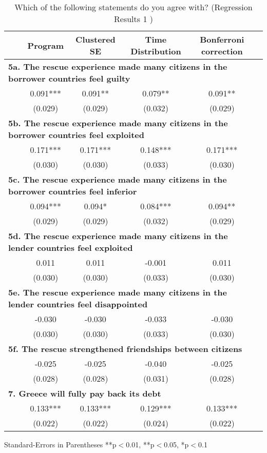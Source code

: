 \documentclass[12pt]{article}
\begin{document}
\begin{table}[h!]
\caption{Which of the following statements do you agree with? (Regression Results 1 )} 
\hskip -2.5cm 
\begin{tabular}{l*{5}{c}}
\hline\hline
\ \  &Program & Clustered SE & Time Distribution & Bonferroni correction \\
\hline
\multicolumn{5}{l}{\textbf{ 5a. The rescue experience made many citizens in the borrower countries feel guilty}} \\
\ \   &0.091{***}&0.091{**}&0.079{**} &0.091{**}\\ 
&(0.029) & (0.029) & (0.032) & (0.029)   \\ 
\multicolumn{5}{l}{\textbf{ 5b. The rescue experience made many citizens in the borrower countries feel exploited}} \\
\ \  &0.171{***}&0.171{***}&0.148{***}&0.171{***} \\ 
&(0.030) & (0.030) & (0.033) & (0.030)  \\
\multicolumn{5}{l}{\textbf{ 5c. The rescue experience made many citizens in the borrower countries feel inferior }} \\
\ \  &0.094{***}&0.094{*}&0.084{***}&0.094{**} \\ 
&(0.029) & (0.029) & (0.032) & (0.029)  \\
\multicolumn{5}{l}{\textbf{ 5d. The rescue experience made many citizens in the lender countries feel exploited}} \\
\ \   &0.011{}&0.011{}&-0.001{} &0.011{}\\ 
&(0.030) & (0.030) & (0.033) & (0.030)   \\ 
\multicolumn{5}{l}{\textbf{ 5e. The rescue experience made many citizens in the lender countries feel disappointed}} \\
\ \  &-0.030{}&-0.030{}&-0.033{}&-0.030{}\\ 
&(0.030) & (0.030) & (0.033) & (0.030)  \\
\multicolumn{5}{l}{\textbf{ 5f. The rescue strengthened friendships between citizens}} \\
\ \  &-0.025{}&-0.025{}&-0.040{}&-0.025{}\\ 
&(0.028) & (0.028) & (0.031) & (0.028) \\
\hline
\multicolumn{5}{l}{\textbf{7. Greece will fully pay back its debt}} \\
\ \   &0.133{***}&0.133{***}&0.129{***} &0.133{***}\\ 
&(0.022) & (0.022) & (0.024) & (0.022)   \\ 
\hline\hline
\end{tabular}
\begin{tablenotes}
\small
\item Standard-Errors in Parentheses \quad ***p$<$0.01, **p$<$0.05, *p$<$0.1  
\end{tablenotes}
\end{table}
\end{document}
